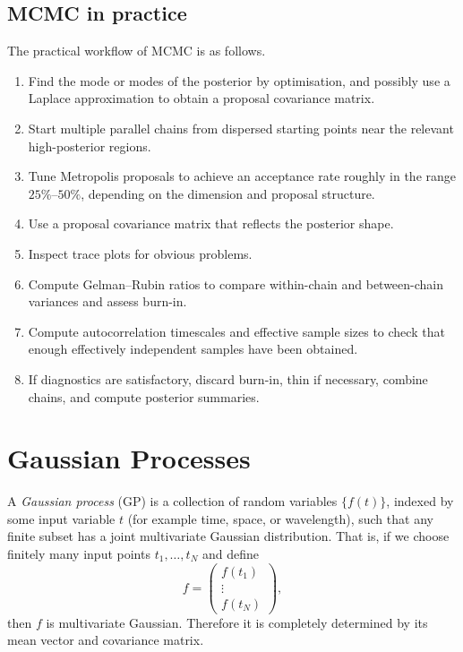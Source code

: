 \documentclass[11pt, titlepage]{article} %
\numberwithin{equation}{section}
\theoremstyle{definition}
\numberwithin{assumption}{section}
\begin{document}
\subsection{MCMC in practice}

The practical workflow of MCMC is as follows.

\begin{enumerate}
    \item Find the mode or modes of the posterior by optimisation, and possibly use a Laplace approximation to obtain a proposal covariance matrix.
    \item Start multiple parallel chains from dispersed starting points near the relevant high-posterior regions.
    \item Tune Metropolis proposals to achieve an acceptance rate roughly in the range $25\%$--$50\%$, depending on the dimension and proposal structure.
    \item Use a proposal covariance matrix that reflects the posterior shape.
    \item Inspect trace plots for obvious problems.
    \item Compute Gelman--Rubin ratios to compare within-chain and between-chain variances and assess burn-in.
    \item Compute autocorrelation timescales and effective sample sizes to check that enough effectively independent samples have been obtained.
    \item If diagnostics are satisfactory, discard burn-in, thin if necessary, combine chains, and compute posterior summaries.
\end{enumerate}

\section{Gaussian Processes}

A \textit{Gaussian process} (GP) is a collection of random variables $\{f(t)\}$, indexed by some input variable $t$ (for example time, space, or wavelength), such that any finite subset has a joint multivariate Gaussian distribution. That is, if we choose finitely many input points $t_1,\dots,t_N$ and define
\begin{equation*}
    f=
    \begin{pmatrix}
        f(t_1)\\
        \vdots\\
        f(t_N)
    \end{pmatrix},
\end{equation*}
then $f$ is multivariate Gaussian. Therefore it is completely determined by its mean vector and covariance matrix.
\end{document}
